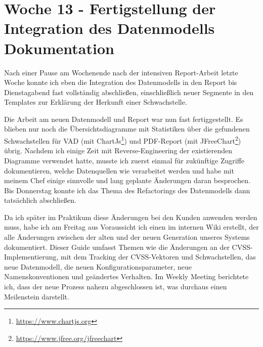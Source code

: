\section{Woche 13 - Fertigstellung der Integration des Datenmodells \headerand Dokumentation} \label{sec:bericht-wo-13}


\lweekdaymarginpar{\weekdayMondayShort, \weekdayTuesdayShort}

Nach einer Pause am Wochenende nach der intensiven Report-Arbeit letzte Woche konnte ich eben die Integration des Datenmodells in den Report bis Dienstagabend fast vollständig abschließen, einschließlich neuer Segmente in den Templates zur Erklärung der Herkunft einer Schwachstelle.

\sweekdaymarginpar{\weekdayWednesdayShort, \weekdayThursdayShort}

Die Arbeit am neuen Datenmodell und Report war nun fast fertiggestellt.
Es blieben nur noch die Übersichtsdiagramme mit Statistiken über die gefundenen Schwachstellen für VAD (mit ChartJs\footnote{\url{https://www.chartjs.org}}) und PDF-Report (mit JFreeChart\footnote{\url{https://www.jfree.org/jfreechart}}) übrig.
Nachdem ich einige Zeit mit Reverse-Engineering der existierenden Diagramme verwendet hatte, musste ich zuerst einmal für zukünftige Zugriffe dokumentieren, welche Datenquellen wie verarbeitet werden und habe mit meinem Chef einige sinnvolle und lang geplante Änderungen daran besprochen.
Bis Donnerstag konnte ich das Thema des Refactorings des Datenmodells dann tatsächlich abschließen.

\sweekdaymarginpar{\weekdayFridayLong}

Da ich später im Praktikum diese Änderungen bei den Kunden anwenden werden muss, habe ich am Freitag aus Voraussicht ich einen  im internen Wiki erstellt, der alle Änderungen zwischen der alten und der neuen Generation unseres Systems dokumentiert.
Dieser Guide umfasst Themen wie die Änderungen an der CVSS-Implementierung, mit dem Tracking der CVSS-Vektoren und Schwachstellen, das neue Datenmodell, die neuen Konfigurationsparameter, neue Namenskonventionen und geändertes Verhalten.
Im Weekly Meeting berichtete ich, dass der neue Prozess nahezu abgeschlossen ist, was durchaus einen Meilenstein darstellt.
